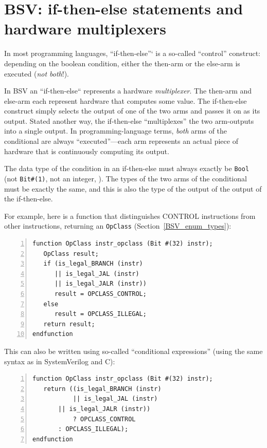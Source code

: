 
\section{BSV: if-then-else statements and hardware multiplexers}

\label{BSV_Combo_Circuits_if_then_else}


In most programming languages, ``if-then-else''` is a so-called
``control'' construct: depending on the boolean condition, either the
then-arm or the else-arm is executed (\emph{not both}!).

In BSV an ``if-then-else`` represents a hardware \emph{multiplexer}.
The then-arm and else-arm each represent hardware that computes some
value.  The if-then-else construct simply selects the output of one of
the two arms and passes it on as its output.  Stated another way, the
if-then-else ``multiplexes'' the two arm-outputs into a single output.
In programming-language terms, \emph{both} arms of the conditional are
always ``executed''---each arm represents an actual piece of hardware
that is continuously computing its output.

The data type of the condition in an if-then-else must always exactly
be \verb|Bool| (not \verb|Bit#(1)|, not an integer, {\etc}).  The
types of the two arms of the conditional must be exactly the same, and
this is also the type of the output of the output of the if-then-else.

For example, here is a function that distinguishes CONTROL
instructions from other instructions, returning an \verb|OpClass|
(Section~\ref{BSV_enum_types}):

\begin{Verbatim}[frame=single, numbers=left]
function OpClass instr_opclass (Bit #(32) instr);
   OpClass result;
   if (is_legal_BRANCH (instr)
      || is_legal_JAL (instr)
      || is_legal_JALR (instr))
      result = OPCLASS_CONTROL;
   else
      result = OPCLASS_ILLEGAL;
   return result;
endfunction
\end{Verbatim}

This can also be written using so-called ``conditional expressions''
(using the same syntax as in SystemVerilog and C):

\begin{Verbatim}[frame=single, numbers=left]
function OpClass instr_opclass (Bit #(32) instr);
   return ((is_legal_BRANCH (instr)
           || is_legal_JAL (instr)
	   || is_legal_JALR (instr))
           ? OPCLASS_CONTROL
	   : OPCLASS_ILLEGAL);
endfunction
\end{Verbatim}

